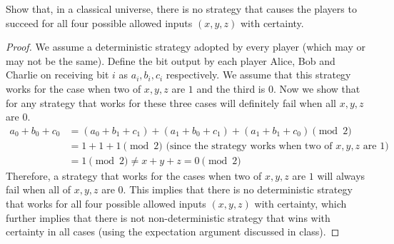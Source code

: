 \begin{solution}[label=ques:3a]
  \begin{question}
    Show that, in a classical universe, there is no strategy that
causes the players to succeed for all four possible
allowed inputs $(x,y,z)$ with certainty.
  \end{question}
  \tcblower{}
  \begin{proof}
    We assume a deterministic strategy adopted by every player (which may or may not be the same). Define the bit output by each player Alice, Bob and Charlie on receiving bit $i$ as $a_i, b_i, c_i$ respectively. We assume that this strategy works for the case when two of $x, y, z$ are $1$ and the third is $0$. Now we show that for any strategy that works for these three cases will definitely fail when all $x, y, z$ are $0$.
    \begin{equation}
      \begin{split}
        a_0 + b_0 + c_0 &= (a_0 + b_1 + c_1) + (a_1 + b_0 + c_1) + (a_1 + b_1 + c_0) \pmod{2}\\
        &= 1 + 1 + 1 \pmod{2}\text{ (since the strategy works when two of $x, y, z$ are $1$)}\\
        &= 1 \pmod{2} \neq x + y + z = 0 \pmod{2}
      \end{split}
      \label{eq:ghzfail}
    \end{equation}
    Therefore, a strategy that works for the cases when two of $x, y, z$ are $1$ will always fail when all of $x, y, z$ are $0$. This implies that there is no deterministic strategy that works for all four possible allowed inputs $(x, y, z)$ with certainty, which further implies that there is not non-deterministic strategy that wins with certainty in all cases (using the expectation argument discussed in class).
  \end{proof}
\end{solution}

